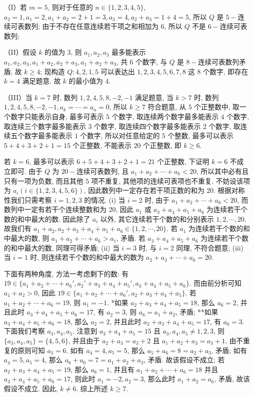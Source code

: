 \begin{solutions}
（I）若 $m=5$, 则对于任意的 $n \in \{1, 2, 3, 4, 5\}$,
$a_2 = 1, a_1 = 2, a_1 + a_2 = 2 + 1 = 3, a_3 = 4, a_2 + a_3 = 1 + 4 = 5$,
所以 $Q$ 是 $5-$连续可表数列;
由于不存在任意连续若干项之和相加为 $6$,
所以 $Q$ 不是 $6-$连续可表数列;

（II）假设 $k$ 的值为 $3$, 则 $a_1, a_2, a_3$ 最多能表示
$a_1, a_2, a_3, a_1+a_2, a_2+a_3, a_1+a_2+a_3$, 共 $6$ 个数字,
与 $Q$ 是 $8-$连续可表数列矛盾, 故 $k \geqslant 4$;
现构造 $Q: 4, 2, 1, 5$ 可以表达出 $1, 2, 3, 4, 5, 6, 7, 8$ 这 $8$ 个数字,
即存在 $k=4$ 满足题意.
故 $k$ 的最小值为 $4$.

（III）当 $k=7$ 时, 数列 $1, 2, 4, 5, 8, -2, -1$ 满足题意,
当 $k>7$ 时, 数列 $1, 2, 4, 5, 8, -2, -1, a_k = \cdots = a_n = 0$, 所以 $k \geqslant 7$ 符合题意,
从 $5$ 个正整数中, 取一个数字只能表示自身, 最多可表示 $5$ 个数字,
取连续两个数字最多能表示 $4$ 个数字, 取连续三个数字最多能表示 $3$ 个数字,
取连续四个数字最多能表示 $2$ 个数字, 取连续五个数字最多能表示 $1$ 个数字,
所以对任意给定的 $5$ 个整数, 最多可以表示 $5+4+3+2+1=15$ 个正整数, 不能表示 $20$ 个正整数, 即 $k \geqslant 6$.

若 $k=6$, 最多可以表示 $6+5+4+3+2+1=21$ 个正整数,
下证明 $k=6$ 不成立即可.
由于 $Q$ 为 $20-$连续可表数列, 且 $a_1+a_2+\cdots+a_k < 20$,
所以其中必有且只有一项为负数, 而且其他 $5$ 项不重复, 其他项的连续可表项也不重复.
不妨设该项为 $a_i (i \in \{1, 2, 3, 4, 5, 6\})$,
因此数列中一定存在若干项正数的和为 $20$.
根据对称性我们只需考察 $i=1, 2, 3$ 的情况.
(i) 当 $i=2$ 时, 由于 $a_1+a_2+\cdots+a_6 < 20$, 而数列中一定有若干个连续整数和为 $20$, 因此 $a_1$ 或 $a_3+a_4+a_5+a_6$ 为连续若干个数的和中最大的数.
因此除了 $a_i$ 以外, 其它连续若干个数的和分别表示 $1, 2, \cdots, 20$.
故我们有 $a_1+a_2, a_2+a_3+a_4+a_5+a_6 \in \{1, 2, \cdots, 20\}$.
若 $a_1$ 为连续若干个数的和中最大的数, 则 $a_1+a_2+\cdots+a_6 > a_1$, 矛盾.
若 $a_3+a_4+a_5+a_6$ 为连续若干个数的和中最大的数, 同理可得矛盾;
(ii) 当 $i=3$ 时, 与 $i=2$ 同理, 不符合题意;
(iii) 当 $i=1$ 时, 则连续若干个数的和中最大的数为 $a_2+a_3+\cdots+a_6=20$.

下面有两种角度, 方法一考虑剩下的数:
有 $19 \in \{a_1+a_2+\cdots+a_6', a_2'+a_3+a_4+a_5', a_3+a_4+a_5+a_6\}$.
而由前分析可知 $a_1+a_2 > 0$, 因此 $19 \in \{a_1+a_2+\cdots+a_6', a_2+a_3+a_4+a_5\}$.
 若 $a_1+a_2+\cdots+a_6=19$, 则 $a_1=-1$.
*如果 $a_2+a_3+a_4+a_5=18$, 那么 $a_6=2$, 并且此时 $a_3+a_4+a_5+a_6=17$,
有 $a_2=3$, 则 $a_6=a_1+a_2$, 矛盾;
**如果 $a_3+a_4+a_5+a_6=18$, 那么 $a_2=2$, 并且此时 $a_2+a_3+a_4+a_5=17$, 有 $a_6=3$.
下面我们考察 $a_3, a_4, a_5$.
注意到 $a_3+a_4+a_5=15$ 且 $a_3, a_4, a_5 \neq 1, 2, 3$,
则 $\{a_3, a_4, a_5\} = \{4, 5, 6\}$, 并且由于 $a_2+a_3=a_3+2$ 且 $a_1+a_2+a_3=a_3+1$,
由不重复的原则可知 $a_3=6$. 如有 $a_4=4, a_5=5$,
那么 $a_5+a_6=8=a_2+a_3$, 矛盾; 如有 $a_4=5, a_5=4$,
那么 $a_6+a_6=7=a_1+a_2+a_3$, 矛盾. 故该假设不成立;
 若 $a_2+a_3+a_4+a_5=19$, 那么 $a_6=1$, 并且有 $a_1+a_2+\cdots+a_6=18$
并且 $a_3+a_4+a_5+a_6=17$, 则此时 $a_1=-2, a_2=3$,
那么此时 $a_1+a_2=a_6$, 矛盾, 故该假设不成立.
因此, $k \neq 6$.
综上所述 $k \geqslant 7$.


\end{solutions}
